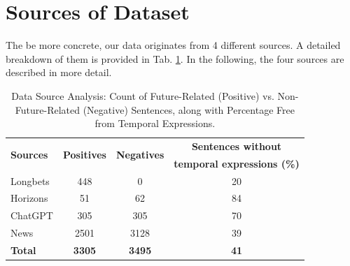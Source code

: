 \documentclass[a4paper,10pt]{report} %
\begin{document}
\section{Sources of Dataset}
The be more concrete, our data originates from 4 different sources. A detailed breakdown of them is provided in Tab. \ref{tab:dataset}. In the following, the four sources are described in more detail.

\begin{table}[h]
  \centering
  \begin{tabular}{lccc}
    \toprule
    \multirow{2}{*}{\textbf{Sources}} & \multirow{2}{*}{\textbf{Positives}} & \multirow{2}{*}{\textbf{Negatives}} & \textbf{Sentences without} \\
    & & & \textbf{temporal expressions (\%)} \\
    \midrule
    Longbets & 448 & 0 & 20 \\
    Horizons & 51 & 62 & 84 \\
    ChatGPT & 305 & 305 & 70 \\
    News & 2501 & 3128 & 39 \\
    \bottomrule
    \textbf{Total} & \textbf{3305} & \textbf{3495} & \textbf{41} \\
  \bottomrule
  \end{tabular}
  \caption{Data Source Analysis: Count of Future-Related (Positive) vs. Non-Future-Related (Negative) Sentences, along with Percentage Free from Temporal Expressions.}
  \label{tab:dataset}
\end{table}
\end{document}
